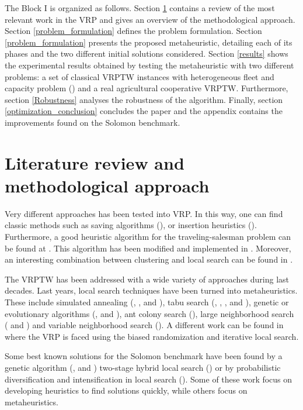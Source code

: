 The Block I is organized as follows. Section \ref{review} contains a review of the most relevant work in the VRP and gives an overview of the methodological approach. Section \ref{problem_formulation} defines the problem formulation. Section \ref{problem_formulation} presents the proposed metaheuristic, detailing each of its phases and the two different initial solutions considered. Section \ref{results} shows the experimental results obtained by testing the metaheuristic with two different problems: a set of classical VRPTW instances with heterogeneous fleet and capacity problem (\cite{Solomon_1987}) and a real agricultural cooperative VRPTW. Furthermore, section \ref{Robustness} analyses the robustness of the algorithm. Finally, section \ref{optimization_conclusion} concludes the paper and the appendix contains the improvements found on the Solomon benchmark.

\section{Literature review and methodological approach}\label{review}
Very different approaches has been tested into VRP. In this way, one can find classic methods such as saving algorithms (\cite{Clark}), or insertion heuristics (\cite{Solomon_1987}). Furthermore, a good heuristic algorithm for the traveling-salesman problem can be found at \cite{L-K}. This algorithm has been modified and implemented in \cite{Helsgaun}. Moreover, an interesting combination between clustering and local search can be found in \cite{ambro}.

The VRPTW has been addressed with a wide variety of approaches during last decades. Last years, local search techniques have been turned into metaheuristics. These include simulated annealing (\cite{Chiang}, \cite{Czech}, \cite{Balbina} and \cite{Woch}), tabu search (\cite{Backer}, \cite{Chiang2}, \cite{Cordeau}, \cite{Rochat} and \cite{Taillard}), genetic or evolutionary algorithms (\cite{Gehring}, \cite{bra3} and \cite{Potvin1996}), ant colony search (\cite{Gambardella}), large neighborhood search (\cite{Shaw1} and \cite{Shaw2}) and variable neighborhood search (\cite{Rousseau}). A different work can be found in \cite{Juan} where the VRP is faced using the biased randomization and iterative local search.

Some best known solutions for the Solomon benchmark have been found by a genetic algorithm (\cite{Berger}, \cite{bra} and \cite{bra2}) two-stage hybrid local search (\cite{Bent}) or by probabilistic diversification and intensification in local search (\cite{Rochat}). Some of these work focus on developing heuristics to find solutions quickly, while others focus on metaheuristics.

